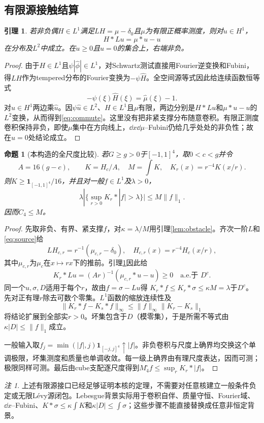 \documentclass[UTF8,11pt,a4paper,fontset=fandol]{ctexart}
\newtheorem{lemma}[theorem]{引理}
\newtheorem{proposition}[theorem]{命题}
\theoremstyle{remark}\newtheorem{remark}[theorem]{注}
\newcommand{\1}{\mathbf1}\newcommand{\pos}[1]{(#1)_+}
\begin{document}
\subsection{有限源接触结算}
\begin{lemma}\label{lem:finite-source}
若非负偶$H\in L^1$满足$LH=\mu-\delta_0$且$\mu$为有限正概率测度，则对$u\in H^1$，
\begin{equation}\label{eq:commute}
 H*Lu=\mu*u-u
\end{equation}
在分布及$L^2$中成立。在$u\ge0$且$u=0$的集合上，右端非负。
\end{lemma}
\begin{proof}
由于$H\in L^1$且$\psi|\widehat\phi|\in L^1$，对Schwartz测试直接用Fourier逆变换和Fubini，得$LH$作为tempered分布的Fourier变换为$-\psi\widehat H$。全空间源等式因此给连续函数恒等式
\[
 -\psi(\xi)\widehat H(\xi)=\widehat\mu(\xi)-1.
\]
对$u\in H^1$两边乘$\widehat u$。因$\psi\widehat u\in L^2$、$H\in L^1$且$\mu$有限，两边分别是$H*Lu$和$\mu*u-u$的$L^2$变换，从而得到\eqref{eq:commute}。这里没有把非紧支撑分布随意卷积。有限正测度卷积保持非负，即使$\mu$集中在方向线上，$\dd x\dd\mu$--Fubini仍给几乎处处的非负性；故在$u=0$处结论成立。
\end{proof}

\begin{proposition}[本构造的全尺度比较]\label{prop:transfer}
若$G\ge g>0$于$[-1,1]^4$，取$0<c<g$并令
\[
 A=16(g-c),\qquad K=H_c/A,\quad M=\int K,\quad K_r(x)=r^{-4}K(x/r).
\]
则$K\ge\1_{[-1,1]^4}/16$，并且对一般$f\in L^1$及$\lambda>0$，
\[
 \lambda|\{\sup_{r>0}K_r*|f|>\lambda\}|\le M\|f\|_1.
\]
因而$C_4\le M$。
\end{proposition}
\begin{proof}
先取非负、有界、紧支撑$f$，对$\kappa=\lambda/M$用引理\ref{lem:obstacle}。齐次一阶$L$和\eqref{eq:source}给
\[
 LH_{c,r}=r^{-1}(\mu_{c,r}-\delta_0),
 \quad H_{c,r}(x)=r^{-4}H_c(x/r),
\]
其中$\mu_{c,r}$为$\mu_c$在$x\mapsto rx$下的推前。引理\ref{lem:finite-source}因此给
\[
 K_r*Lu=(Ar)^{-1}(\mu_{c,r}*u-u)\ge0\quad\text{a.e.于 }D^c.
\]
同一个$u,\sigma,D$适用于每个$r$，故由$f=\sigma-Lu$得
$K_r*f\le K_r*\sigma\le\kappa M=\lambda$于$D^c$。
先对正有理$r$除去可数个零集。$L^1$函数的缩放连续性及
\[
 \|K_r*f-K_s*f\|_\infty\le\|f\|_\infty\|K_r-K_s\|_1
\]
将结论扩展到全部实$r>0$。坏集包含于$D$（模零集），于是所需不等式由$\kappa|D|\le\|f\|_1$成立。

一般输入取$f_j=\min(|f|,j)\1_{[-j,j]^4}\uparrow|f|$。非负卷积与尺度上确界均交换这个单调极限，坏集测度和质量也单调收敛。每一级上确界由有理尺度表达，因而可测；极限同样可测。最后由cube支配逐尺度得到$M_4^\square f\le\sup_rK_r*|f|$。
\end{proof}
\begin{remark}
上述有限源接口已经足够证明本核的定理，不需要对任意核建立一般条件负定或无限L\'evy源闭包。Lebesgue背景实际用于卷积自伴、质量守恒、Fourier域、$\dd x$--Fubini、$K*\sigma\le\kappa\int K$和$\kappa|D|\le\int\sigma$；这些步骤不能直接替换成任意非恒定背景。
\end{remark}
\end{document}
